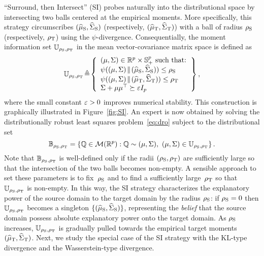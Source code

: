 \documentclass{article}
\begin{document}
``Surround, then Intersect'' (SI) probes naturally into the distributional space by intersecting two balls centered at the empirical moments. More specifically, this strategy circumscribes $(\widehat {\mu}_{\rm S}, \widehat{\Sigma}_{\rm S})$ (respectively, $(\widehat {\mu}_{\rm T}, \widehat{\Sigma}_{\rm T})$) with a ball of radius $\rho_{\rm S}$ (respectively, $\rho_{\rm T}$) using the $\psi$-divergence. Consequentially, the moment information set $\mathbb U_{\rho_{\rm S}, \rho_{\rm T}}$ in the mean vector-covariance matrix space is defined as
\begin{equation*}
\mbb U_{\rho_{\rm S}, \rho_{\rm T}}
\!\Let \!\left\{
\begin{array}{l}
(\m, \cov)\in \R^p\times \PSD^p \text{ such that: } \\
\psi((\mu, \Sigma) \! \parallel \! (\wh \mu_{\rm S}, \wh \Sigma_{\rm S})) \leq \rho_{\rm S} \!\\
\psi((\mu, \Sigma) \! \parallel \! (\wh \mu_{\rm T}, \wh \Sigma_{\rm T})) \leq \rho_{\rm T}\!\\
\cov + \m \m^\top \succeq \eps I_p
\end{array}  \! \!\right\},
\end{equation*}
where the small constant $\varepsilon > 0$ improves numerical stability. This construction is graphically illustrated in Figure~\ref{fig:SI}.
An expert is now obtained by solving the distributionally robust least squares problem~\eqref{eq:dro} subject to the distributional set
\[
    \mathbb B_{\rho_{\rm S}, \rho_{\rm T}} =  \left\{ 
        \mathbb Q \in \mathcal M(\mathbb{R}^{p}): \mathbb Q \sim (\mu, \Sigma),~ (\mu, \Sigma) \in \mathbb U_{\rho_{\rm S}, \rho_{\rm T}}
	\right\}.
\]
Note that $\mathbb B_{\rho_{\rm S}, \rho_{\rm T}}$ is well-defined only if the radii $(\rho_{\rm S}, \rho_{\rm T})$ are sufficiently large so that the intersection of the two balls becomes non-empty. A sensible approach to set these parameters is to fix~$\rho_{\rm S}$ and to find a sufficiently large~$\rho_{\rm T}$ so that~$\mathbb U_{\rho_{\rm S}, \rho_{\rm T}}$ is non-empty. In this way, the SI strategy characterizes the explanatory power of the source domain to the target domain by the radius $\rho_{\rm S}$: if $\rho_{\rm S} = 0$ then $\mathbb U_{\rho_{\rm S}, \rho_{\rm T}}$ becomes a singleton $\{(\widehat {\mu}_{\rm S}, \widehat{\Sigma}_{\rm S})\}$, representing the \textit{belief} that the source domain possess absolute explanatory power onto the target domain. As $\rho_{\rm S}$ increases, $\mathbb U_{\rho_{\rm S}, \rho_{\rm T}}$ is gradually pulled towards the empirical target moments $(\widehat {\mu}_{\rm T}, \widehat{\Sigma}_{\rm T})$. Next, we study the special case of the SI strategy with the KL-type divergence and the Wasserstein-type divergence.
\end{document}
